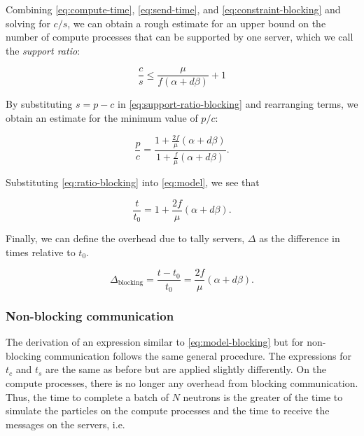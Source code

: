 \noindent Combining \eqref{eq:compute-time}, \eqref{eq:send-time}, and
\eqref{eq:constraint-blocking} and solving for $c/s$, we can obtain a rough
estimate for an upper bound on the number of compute processes that can be
supported by one server, which we call the \emph{support ratio}:

\begin{equation}
  \label{eq:support-ratio-blocking}
  \frac{c}{s} \le \frac{\mu}{f \left ( \alpha + d\beta \right )} + 1
\end{equation}

\noindent By substituting $s = p - c$ in \eqref{eq:support-ratio-blocking} and
rearranging terms, we obtain an estimate for the minimum value of $p/c$:

\begin{equation}
  \label{eq:ratio-blocking}
  \frac{p}{c} = \frac{1 + \frac{2f}{\mu} \left ( \alpha + d \beta \right )}{1 +
    \frac{f}{\mu} \left ( \alpha + d \beta \right )}.
\end{equation}

\noindent Substituting \eqref{eq:ratio-blocking} into \eqref{eq:model}, we see
that

\begin{equation}
  \label{eq:model-blocking}
  \frac{t}{t_0} = 1 + \frac{2f}{\mu} \left ( \alpha + d\beta
    \right ).
\end{equation}

\noindent Finally, we can define the overhead due to tally servers, $\Delta$ as
the difference in times relative to $t_0$.

\begin{equation}
  \label{eq:overhead-blocking}
  \Delta_{\text{blocking}} = \frac{t - t_0}{t_0} = \frac{2f}{\mu} \left ( \alpha + d\beta
    \right ).
\end{equation}

\subsubsection{Non-blocking communication}

The derivation of an expression similar to \eqref{eq:model-blocking} but for
non-blocking communication follows the same general procedure. The expressions
for $t_c$ and $t_s$ are the same as before but are applied slightly
differently. On the compute processes, there is no longer any overhead from
blocking communication. Thus, the time to complete a batch of $N$ neutrons is
the greater of the time to simulate the particles on the compute processes and
the time to receive the messages on the servers, i.e.

